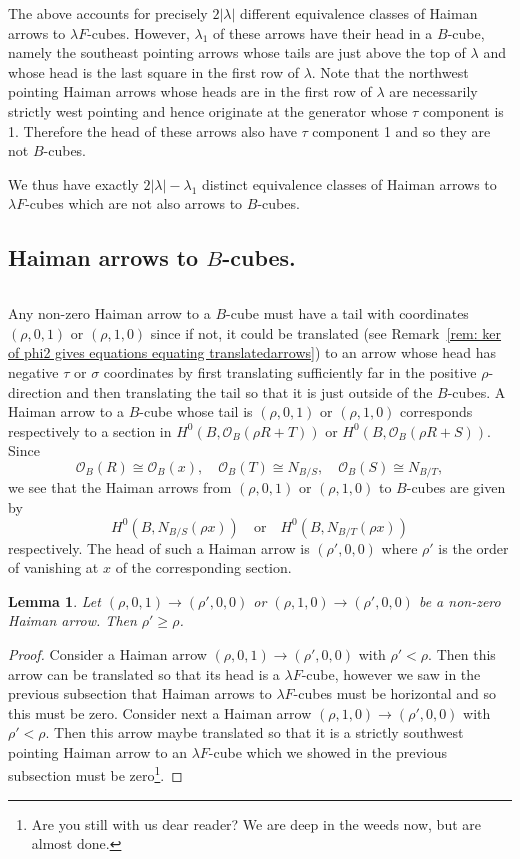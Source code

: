 \documentclass[12pt]{amsart}
\newtheorem{lemma}[theorem]{Lemma}
\theoremstyle{definition}
\renewcommand{\O}{\mathcal{O}}
\newcommand{\SubSecSpace}{$\,$\vspace{0.2cm}\par } %
\begin{document}
The above accounts for precisely $2|\lambda |$ different equivalence
classes of Haiman arrows to $\lambda F$-cubes. However, $\lambda_{1}$
of these arrows have their head in a $B$-cube, namely the southeast
pointing arrows whose tails are just above the top of $\lambda$ and
whose head is the last square in the first row of $\lambda$. Note that
the northwest pointing Haiman arrows whose heads are in the first row
of $\lambda$ are necessarily strictly west pointing and hence
originate at the generator whose $\tau$ component is 1. Therefore the
head of these arrows also have $\tau$ component 1 and so they are not
$B$-cubes.

We thus have exactly $2|\lambda |-\lambda_{1}$ distinct equivalence
classes of Haiman arrows to $\lambda F$-cubes which are not also
arrows to $B$-cubes.

\subsection{Haiman arrows to $B$-cubes.}\SubSecSpace Any non-zero
Haiman arrow to a $B$-cube must have a tail with coordinates $(\rho
,0,1)$ or $(\rho ,1,0)$ since if not, it could be translated (see
Remark~\ref{rem: ker of phi2 gives equations equating
translatedarrows}) to an arrow whose head has negative $\tau$ or
$\sigma$ coordinates by first translating sufficiently far in the
positive $\rho$-direction and then translating the tail so that it is
just outside of the $B$-cubes. A Haiman arrow to a $B$-cube whose tail
is $(\rho ,0,1)$ or $(\rho ,1,0)$ corresponds respectively to a
section in $H^{0}(B,\O_{B}(\rho R+T))$ or $H^{0}(B,\O_{B}(\rho
R+S))$. Since
\[
\O_B (R)\cong \O_{B}(x),\quad \O_{B}(T)\cong N_{B/S},\quad \O_{B}(S)\cong N_{B/T},
\]
we see that the Haiman arrows from $(\rho ,0,1)$ or $(\rho ,1,0)$ to
$B$-cubes are given by 
\[
H^{0}(B,N_{B/S}(\rho x)) \quad \text{or}\quad
H^{0}(B,N_{B/T}(\rho x))
\]
respectively. The head of such a Haiman
arrow is $(\rho ',0,0)$ where $\rho '$ is the order of vanishing at
$x$ of the corresponding section.

\begin{lemma}\label{lem: Haiman arrows to B-cubes must vanish to the
order of the generator} Let $(\rho ,0,1)\to (\rho ',0,0)$ or $(\rho
,1,0)\to (\rho ',0,0)$ be a non-zero Haiman arrow. Then $\rho '\geq
\rho$.
\end{lemma}
\begin{proof}
Consider a Haiman arrow $(\rho ,0,1)\to (\rho ',0,0)$ with $\rho
'<\rho$. Then this arrow can be translated so that its head is a
$\lambda F$-cube, however we saw in the previous subsection that
Haiman arrows to $\lambda F$-cubes must be horizontal and so this must
be zero. Consider next a Haiman arrow $(\rho ,1,0)\to (\rho ',0,0)$
with $\rho '<\rho$. Then this arrow maybe translated so that it is a
strictly southwest pointing Haiman arrow to an $\lambda F$-cube which
we showed in the previous subsection must be zero\footnote{Are you
still with us dear reader? We are deep in the weeds now, but are
almost done.}.
\end{proof}
\end{document}
